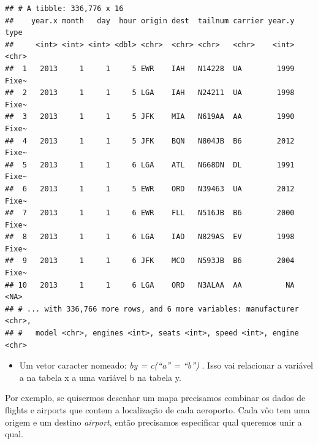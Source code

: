 \documentclass[
]{article}
\newenvironment{Shaded}{\begin{snugshade}}{\end{snugshade}}
\newcommand{\KeywordTok}[1]{\textcolor[rgb]{0.13,0.29,0.53}{\textbf{#1}}}
\newcommand{\NormalTok}[1]{#1}
\newcommand{\OperatorTok}[1]{\textcolor[rgb]{0.81,0.36,0.00}{\textbf{#1}}}
\newcommand{\StringTok}[1]{\textcolor[rgb]{0.31,0.60,0.02}{#1}}
\providecommand{\tightlist}{%
  \setlength{\itemsep}{0pt}\setlength{\parskip}{0pt}}
\begin{document}
\begin{verbatim}
## # A tibble: 336,776 x 16
##    year.x month   day  hour origin dest  tailnum carrier year.y type 
##     <int> <int> <int> <dbl> <chr>  <chr> <chr>   <chr>    <int> <chr>
##  1   2013     1     1     5 EWR    IAH   N14228  UA        1999 Fixe~
##  2   2013     1     1     5 LGA    IAH   N24211  UA        1998 Fixe~
##  3   2013     1     1     5 JFK    MIA   N619AA  AA        1990 Fixe~
##  4   2013     1     1     5 JFK    BQN   N804JB  B6        2012 Fixe~
##  5   2013     1     1     6 LGA    ATL   N668DN  DL        1991 Fixe~
##  6   2013     1     1     5 EWR    ORD   N39463  UA        2012 Fixe~
##  7   2013     1     1     6 EWR    FLL   N516JB  B6        2000 Fixe~
##  8   2013     1     1     6 LGA    IAD   N829AS  EV        1998 Fixe~
##  9   2013     1     1     6 JFK    MCO   N593JB  B6        2004 Fixe~
## 10   2013     1     1     6 LGA    ORD   N3ALAA  AA          NA <NA> 
## # ... with 336,766 more rows, and 6 more variables: manufacturer <chr>,
## #   model <chr>, engines <int>, seats <int>, speed <int>, engine <chr>
\end{verbatim}

\begin{itemize}
\tightlist
\item
  Um vetor caracter nomeado: \emph{by = c(``a'' = ``b'')} . Isso vai
  relacionar a variável a na tabela x a uma variável b na tabela y.
\end{itemize}

Por exemplo, se quisermos desenhar um mapa precisamos combinar os dados
de flights e airports que contem a localização de cada aeroporto. Cada
vôo tem uma origem e um destino \emph{airport}, então precisamos
especificar qual queremos unir a qual.

\begin{Shaded}
\end{Shaded}
\end{document}
